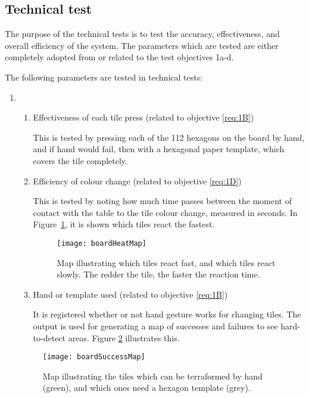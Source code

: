 \subsection{Technical test}\label{subsec:techtest}
The purpose of the technical tests is to test the accuracy, effectiveness, and overall efficiency of the system. The parameters which are tested are either completely adopted from or related to the test objectives 1a-d.

The following parameters are tested in technical tests:
\begin{enumerate}
\item \begin{enumerate}
\item Effectiveness of each tile press (related to objective \ref{req:1B})

This is tested by pressing each of the 112 hexagons on the board by hand, and if hand would fail, then with a hexagonal paper template, which covers the tile completely. 

\item Efficiency of colour change (related to objective \ref{req:1D})
		
This is tested by noting how much time passes between the moment of contact with the table to the tile colour change, measured in seconds. In Figure~\ref{fig:reactionmap}, it is shown which tiles react the fastest.

\begin{figure}[h!]
	\centering
	\texttt{[image: boardHeatMap]}
	\caption{Map illustrating which tiles react fast, and which tiles react slowly. The redder the tile, the faster the reaction time. \label{fig:reactionmap}}
\end{figure}
		
\item Hand or template used (related to objective \ref{req:1B})

It is registered whether or not hand gesture works for changing tiles. The output is used for generating a map of successes and failures to see hard-to-detect areas. Figure \ref{fig:successfailmap} illustrates this.
\end{enumerate}		
		
\begin{figure}[h!]
	\centering
	\texttt{[image: boardSuccessMap]}
	\caption{Map illustrating the tiles which can be terraformed by hand (green), and which ones need a hexagon template (grey).\label{fig:successfailmap}}
\end{figure}


\end{enumerate}
